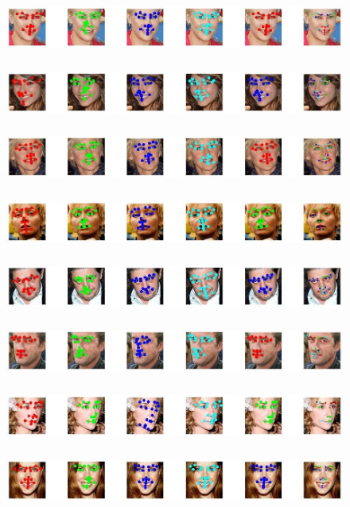 \begin{figure}
  \centering
  \includegraphics[width=6in, height=0.8in]{fid/figures/qualitative/1.jpg} 
  \includegraphics[width=6in, height=0.8in]{fid/figures/qualitative/2.jpg}
  \includegraphics[width=6in, height=0.8in]{fid/figures/qualitative/3.jpg}
  \includegraphics[width=6in, height=0.8in]{fid/figures/qualitative/4.jpg}
  \includegraphics[width=6in, height=0.8in]{fid/figures/qualitative/5.jpg}
  \includegraphics[width=6in, height=0.8in]{fid/figures/qualitative/6.jpg}
  \includegraphics[width=6in, height=0.8in]{fid/figures/qualitative/7.jpg}
  \includegraphics[width=6in, height=0.8in]{fid/figures/qualitative/8.jpg}

\end{figure}
